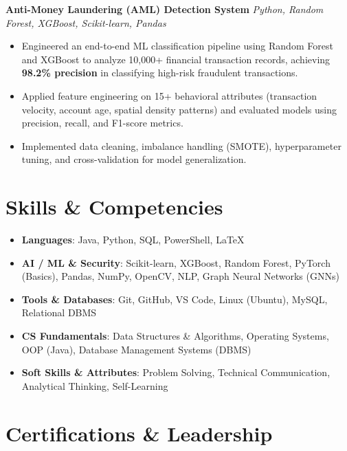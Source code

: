 \documentclass[a4paper,10pt]{article}
\begin{document}
\vspace{1.5pt}
\noindent\textbf{Anti-Money Laundering (AML) Detection System} \hfill \textit{Python, Random Forest, XGBoost, Scikit-learn, Pandas}
\begin{itemize}
    \item Engineered an end-to-end ML classification pipeline using Random Forest and XGBoost to analyze 10,000+ financial transaction records, achieving \textbf{98.2\% precision} in classifying high-risk fraudulent transactions.
    \item Applied feature engineering on 15+ behavioral attributes (transaction velocity, account age, spatial density patterns) and evaluated models using precision, recall, and F1-score metrics.
    \item Implemented data cleaning, imbalance handling (SMOTE), hyperparameter tuning, and cross-validation for model generalization.
\end{itemize}

\section{Skills \& Competencies}
\begin{itemize}
    \item \textbf{Languages}: Java, Python, SQL, PowerShell, LaTeX
    \item \textbf{AI / ML \& Security}: Scikit-learn, XGBoost, Random Forest, PyTorch (Basics), Pandas, NumPy, OpenCV, NLP, Graph Neural Networks (GNNs)
    \item \textbf{Tools \& Databases}: Git, GitHub, VS Code, Linux (Ubuntu), MySQL, Relational DBMS
    \item \textbf{CS Fundamentals}: Data Structures \& Algorithms, Operating Systems, OOP (Java), Database Management Systems (DBMS)
    \item \textbf{Soft Skills \& Attributes}: Problem Solving, Technical Communication, Analytical Thinking, Self-Learning
\end{itemize}

\section{Certifications \& Leadership}
\end{document}
